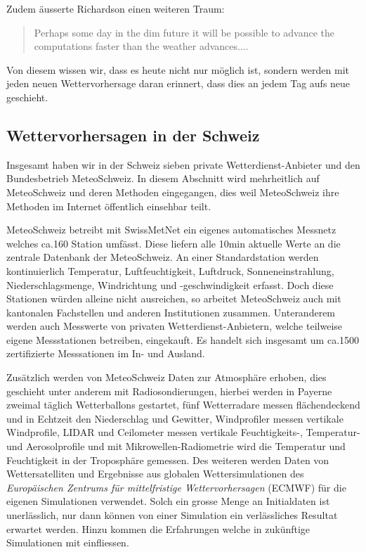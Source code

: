 \begin{refsection}
Zudem äusserte Richardson einen weiteren Traum:
\begin{quote}
Perhaps some day in the dim future it will be possible to advance the computations faster than the weather advances....
\end{quote}
Von diesem wissen wir, dass es heute nicht nur möglich ist, sondern werden mit jeden neuen Wettervorhersage daran erinnert, dass dies an jedem Tag aufs neue geschieht.



\subsection{Wettervorhersagen in der Schweiz
\label{klima:section:wettervorhersagen}}

Insgesamt haben wir in der Schweiz sieben private Wetterdienst-Anbieter und den Bundesbetrieb MeteoSchweiz. In diesem Abschnitt wird mehrheitlich auf MeteoSchweiz und deren Methoden eingegangen, dies weil MeteoSchweiz ihre Methoden im Internet öffentlich einsehbar teilt.

MeteoSchweiz betreibt mit SwissMetNet ein eigenes automatisches Messnetz welches ca.160 Station umfässt. Diese liefern alle 10min aktuelle Werte an die zentrale Datenbank der MeteoSchweiz. An einer Standardstation werden kontinuierlich Temperatur, Luftfeuchtigkeit, Luftdruck, Sonneneinstrahlung, Niederschlagsmenge, Windrichtung und -geschwindigkeit erfasst. Doch diese Stationen würden alleine nicht ausreichen, so arbeitet MeteoSchweiz auch mit kantonalen Fachstellen und anderen Institutionen zusammen. Unteranderem werden auch Messwerte von privaten Wetterdienst-Anbietern, welche teilweise eigene Messstationen betreiben, eingekauft. Es handelt sich insgesamt um ca.1500 zertifizierte Messsationen im In- und Ausland.

Zusätzlich werden von MeteoSchweiz Daten zur Atmosphäre erhoben, dies geschieht unter anderem mit Radiosondierungen, hierbei werden in Payerne zweimal täglich Wetterballons gestartet, fünf Wetterradare messen flächendeckend und in Echtzeit den Niederschlag und Gewitter, Windprofiler messen vertikale Windprofile, LIDAR und Ceilometer messen vertikale Feuchtigkeits-, Temperatur- und Aerosolprofile und mit Mikrowellen-Radiometrie wird die  Temperatur und Feuchtigkeit in der Troposphäre gemessen. Des weiteren werden Daten von Wettersatelliten und Ergebnisse aus globalen Wettersimulationen des {\em Europäischen Zentrums für mittelfristige Wettervorhersagen} (ECMWF) für die eigenen Simulationen verwendet. Solch ein grosse Menge an Initialdaten ist unerlässlich, nur dann können von einer Simulation ein verlässliches Resultat erwartet werden. Hinzu kommen die Erfahrungen welche in zukünftige Simulationen mit einfliessen. \cite{klima:meteoschweiz} 


\end{refsection}
